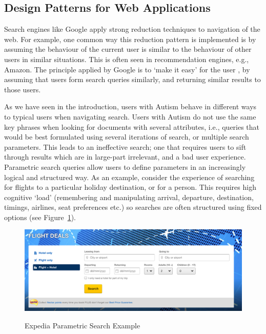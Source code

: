 \documentclass[a4paper, 11pt]{article}
\begin{document}
\subsection{Design Patterns for Web Applications}

Search engines like Google apply strong reduction techniques to navigation of the web. For example, one common way this reduction pattern is implemented is by assuming the behaviour of the current user is similar to the behaviour of other users in similar situations. This is often seen in recommendation engines, e.g., Amazon. The principle applied by Google is to `make it easy' for the user \cite{googleTerms}, by assuming that users form search queries similarly, and returning similar results to those users.

\vspace{5mm}
As we have seen in the introduction, users with Autism behave in different ways to typical users when navigating search. Users with Autism do not use the same key phrases when looking for documents with several attributes, i.e., queries that would be best formulated using several iterations of search, or multiple search parameters. This leads to an ineffective search; one that requires users to sift through results which are in large-part irrelevant, and a bad user experience.  
\vspace{5mm}
Parametric search queries allow users to define parameters in an increasingly logical and structured way. As an example, consider the experience of searching for flights to a particular holiday destination, or for a person. This requires high cognitive `load' (remembering and manipulating arrival, departure, destination, timings, airlines, seat preferences etc.) so searches are often structured using fixed options (see Figure~\ref{exped}).

\begin{figure}[H]
\begin{center}
\includegraphics[scale=0.3]{expedia}\\

\caption{Expedia Parametric Search Example}
\label{exped}
\end{center}
\end{figure}
\end{document}
